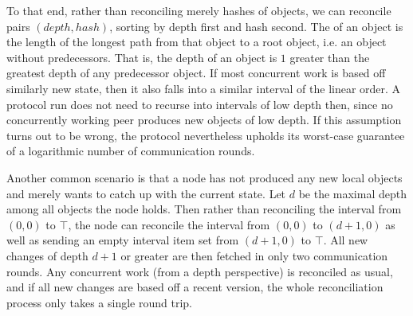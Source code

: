 To that end, rather than reconciling merely hashes of objects, we can reconcile pairs $(\mathit{depth}, \mathit{hash})$, sorting by depth first and hash second. The  of an object is the length of the longest path from that object to a root object, i.e. an object without predecessors. That is, the depth of an object is $1$ greater than the greatest depth of any predecessor object. If most concurrent work is based off similarly new state, then it also falls into a similar interval of the linear order. A protocol run does not need to recurse into intervals of low depth then, since no concurrently working peer produces new objects of low depth. If this assumption turns out to be wrong, the protocol nevertheless upholds its worst-case guarantee of a logarithmic number of communication rounds.

Another common scenario is that a node has not produced any new local objects and merely wants to catch up with the current state. Let $d$ be the maximal depth among all objects the node holds. Then rather than reconciling the interval from $(0, 0)$ to $\top$, the node can reconcile the interval from $(0, 0)$ to $(d + 1, 0)$ as well as sending an empty interval item set from $(d + 1, 0)$ to $\top$. All new changes of depth $d + 1$ or greater are then fetched in only two communication rounds. Any concurrent work (from a depth perspective) is reconciled as usual, and if all new changes are based off a recent version, the whole reconciliation process only takes a single round trip.